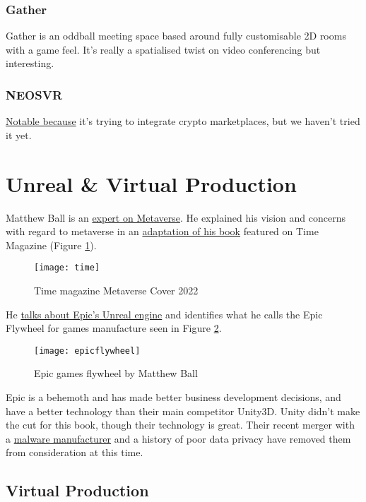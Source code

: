 \subsubsection{Gather}
Gather is an oddball meeting space based around fully customisable 2D rooms with a game feel. It's really a spatialised twist on video conferencing but interesting.  
\subsubsection{NEOSVR}
\href{https://neos.com/}{Notable because} it's trying to integrate crypto marketplaces, but we haven't tried it yet.
\section{Unreal \& Virtual Production}
Matthew Ball is an \href{https://www.matthewball.vc/}{expert on Metaverse}. He explained his vision and concerns with regard to metaverse in an \href{https://time.com/6197849/metaverse-future-matthew-ball/}{adaptation of his book}\cite{ball2020metaverse} featured on Time Magazine (Figure \ref{fig:time}).\par
\begin{figure}
  \centering
    \texttt{[image: time]}
  \caption{Time magazine Metaverse Cover 2022}
  \label{fig:time}
\end{figure}
He \href{https://www.matthewball.vc/all/epicprimer1}{talks about Epic's Unreal engine} and identifies what he calls the Epic Flywheel for games manufacture seen in Figure \ref{fig:epicflywheel}.\par
\begin{figure}
  \centering
    \texttt{[image: epicflywheel]}
  \caption{Epic games flywheel by Matthew Ball}
  \label{fig:epicflywheel}
\end{figure}
Epic is a behemoth and has made better business development decisions, and have a better technology than their main competitor Unity3D. Unity didn't make the cut for this book, though their technology is great. Their recent merger with a \href{https://www.pcgamer.com/unity-is-merging-with-a-company-who-made-a-malware-installer/}{malware manufacturer} and a history of poor data privacy have removed them from consideration at this time.
\subsection{Virtual Production}

